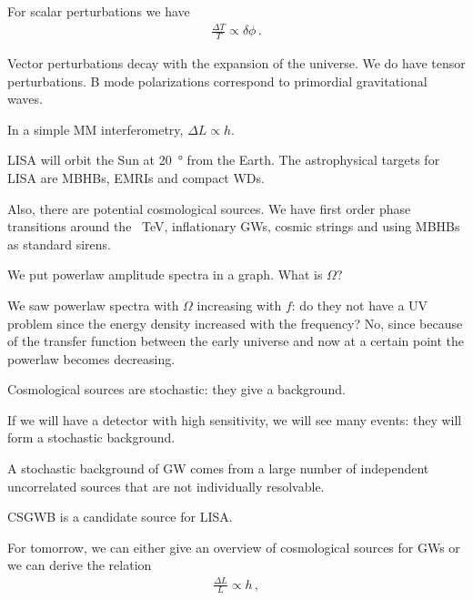 \documentclass[main.tex]{subfiles}
\begin{document}
For scalar perturbations we have 
%
\begin{align}
\frac{\Delta T}{T} \propto \delta \phi 
\,.
\end{align}

Vector perturbations decay with the expansion of the universe. We do have tensor perturbations.  B mode polarizations correspond to primordial gravitational waves. 


In a simple MM interferometry, \(\Delta L \propto h\). 

LISA will orbit the Sun at \SI{20}{\degree} from the Earth. 
The astrophysical targets for LISA are MBHBs, EMRIs and compact WDs. 

Also, there are potential cosmological sources. We have first order phase transitions around the \SI{}{TeV}, inflationary GWs, cosmic strings and using MBHBs as standard sirens. 

We put powerlaw amplitude spectra in a graph. What is \(\Omega \)? 

We saw powerlaw spectra with \(\Omega \) increasing with \(f\): do they not have a UV problem since the energy density increased with the frequency?
No, since because of the transfer function between the early universe and now at a certain point the powerlaw becomes decreasing. 

Cosmological sources are stochastic: they give a background. 

If we will have a detector with high sensitivity, we will see many events: they will form a stochastic background. 


A stochastic background of GW comes from a large number of independent uncorrelated sources that are not individually resolvable.

CSGWB is a candidate source for LISA. 

For tomorrow, we can either give an overview of cosmological sources for GWs or we can derive the relation 
%
\begin{align}
\frac{\Delta L}{L} \propto h
\,,
\end{align}
\end{document}
